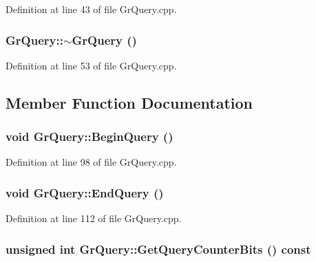 \begin{CompactItemize}
Definition at line 43 of file GrQuery.cpp.\hypertarget{class_gr_query_cc96abe379dae515788dd66506a897d1}{
\subsubsection[{$\sim$GrQuery}]{\setlength{\rightskip}{0pt plus 5cm}GrQuery::$\sim$GrQuery ()}}
\label{class_gr_query_cc96abe379dae515788dd66506a897d1}




Definition at line 53 of file GrQuery.cpp.

\subsection{Member Function Documentation}
\hypertarget{class_gr_query_2fed8cc1e8806f6ae422592978abc282}{
\subsubsection[{BeginQuery}]{\setlength{\rightskip}{0pt plus 5cm}void GrQuery::BeginQuery ()}}
\label{class_gr_query_2fed8cc1e8806f6ae422592978abc282}




Definition at line 98 of file GrQuery.cpp.\hypertarget{class_gr_query_d228edca708b8ed86a27d3bc165b4e72}{
\subsubsection[{EndQuery}]{\setlength{\rightskip}{0pt plus 5cm}void GrQuery::EndQuery ()}}
\label{class_gr_query_d228edca708b8ed86a27d3bc165b4e72}




Definition at line 112 of file GrQuery.cpp.\hypertarget{class_gr_query_3534d970e30de6d5d9ea54d0d9e277d6}{
\subsubsection[{GetQueryCounterBits}]{\setlength{\rightskip}{0pt plus 5cm}unsigned int GrQuery::GetQueryCounterBits () const}}
\label{class_gr_query_3534d970e30de6d5d9ea54d0d9e277d6}





\end{CompactItemize}
